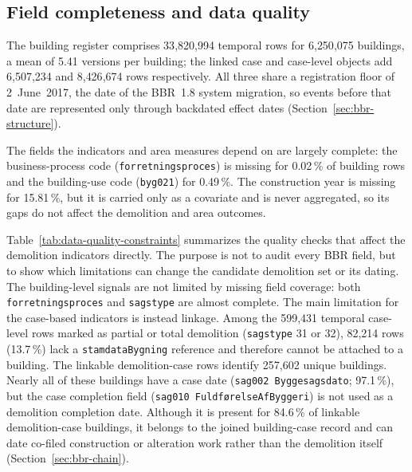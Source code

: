 \subsection{Field completeness and data quality}\label{sec:missingness}

The building register comprises 33{,}820{,}994 temporal rows for
6{,}250{,}075 buildings, a mean of 5.41 versions per building; the linked
case and case-level objects add 6{,}507{,}234 and 8{,}426{,}674 rows
respectively. All three share a registration floor of 2~June~2017, the
date of the BBR~1.8 system migration, so events before that date are
represented only through backdated effect dates
(Section~\ref{sec:bbr-structure}).

The fields the indicators and area measures depend on are largely
complete: the business-process code (\texttt{forretningsproces}) is
missing for 0.02\,\% of building rows and the building-use code
(\texttt{byg021}) for 0.49\,\%. The construction year is missing for
15.81\,\%, but it is carried only as a covariate and is never aggregated,
so its gaps do not affect the demolition and area outcomes.

Table~\ref{tab:data-quality-constraints} summarizes the quality checks
that affect the demolition indicators directly. The purpose is not to
audit every BBR field, but to show which limitations can change the
candidate demolition set or its dating. The building-level signals are
not limited by missing field coverage: both \texttt{forretningsproces}
and \texttt{sagstype} are almost complete. The main limitation for the
case-based indicators is instead linkage. Among the 599{,}431 temporal
case-level rows marked as partial or total demolition
(\texttt{sagstype} 31 or 32), 82{,}214 rows (13.7\,\%) lack a
\texttt{stamdataBygning} reference and therefore cannot be attached to a
building. The linkable demolition-case rows identify 257{,}602 unique
buildings. Nearly all of these buildings have a case date
(\texttt{sag002 Byggesagsdato}; 97.1\,\%), but the case completion field
(\texttt{sag010 Fuldf{\o}relseAfByggeri}) is not used as a demolition
completion date. Although it is present for 84.6\,\% of linkable
demolition-case buildings, it belongs to the joined building-case record
and can date co-filed construction or alteration work rather than the
demolition itself (Section~\ref{sec:bbr-chain}).

